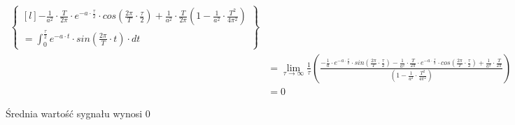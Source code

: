 \begin{task}
\begin{align*}
\begin{Bmatrix*}[l]
{ -\frac{1}{a^2} \cdot \frac{T}{2\pi} \cdot 
 e^{-a\cdot \frac{\tau}{2}} \cdot cos \left(\frac{2\pi}{T}\cdot \frac{\tau}{2}\right) + \frac{1}{a^2}\cdot \frac{T}{2\pi}}
 {\left(1 - \frac{1}{a^2}\cdot \frac{T^2}{4\pi^2}\right)}
 \\
 = \int_{0}^{\frac{\tau}{2}} e^{-a\cdot t} \cdot  sin\left(\frac{2\pi}{T}\cdot t\right)\cdot dt
 \end{Bmatrix*}\\
 &=\lim_{\tau \rightarrow \infty }\frac{1}{\tau}\left(\frac{-\frac{1}{a}\cdot e^{-a\cdot \frac{\tau}{2}} \cdot sin \left(\frac{2\pi}{T}\cdot \frac{\tau}{2}\right)
   -\frac{1}{a^2} \cdot \frac{T}{2\pi} \cdot 
   e^{-a\cdot \frac{\tau}{2}} \cdot cos \left(\frac{2\pi}{T}\cdot \frac{\tau}{2}\right) + \frac{1}{a^2}\cdot \frac{T}{2\pi}}
 {\left(1 - \frac{1}{a^2}\cdot \frac{T^2}{4\pi^2}\right)} \right)\\
 &=0
\end{align*}

Średnia wartość sygnału wynosi $0$
\end{task}